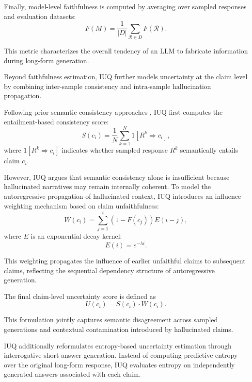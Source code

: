 Finally, model-level faithfulness is computed by averaging over sampled responses and evaluation datasets:
\begin{equation}
F(M)=\frac{1}{|D|}
\sum_{\mathcal{R}\in D}F(\mathcal{R}).
\end{equation}

This metric characterizes the overall tendency of an LLM to fabricate information during long-form generation.


Beyond faithfulness estimation, IUQ further models uncertainty at the claim level by combining inter-sample consistency and intra-sample hallucination propagation.

Following prior semantic consistency approaches , IUQ first computes the entailment-based consistency score:
\begin{equation}
S(c_i)=\frac{1}{N}\sum_{k=1}^{N}{1}[R^k\Rightarrow c_i],
\end{equation}
where ${1}[R^k\Rightarrow c_i]$ indicates whether sampled response $R^k$ semantically entails claim $c_i$.

However, IUQ argues that semantic consistency alone is insufficient because hallucinated narratives may remain internally coherent. To model the autoregressive propagation of hallucinated context, IUQ introduces an influence weighting mechanism based on claim unfaithfulness:
\begin{equation}
W(c_i)=\sum_{j=1}^{i}(1-F(c_j))E(i-j),
\end{equation}
where $E$ is an exponential decay kernel:
\begin{equation}
E(i)=e^{-\lambda i}.
\end{equation}

This weighting propagates the influence of earlier unfaithful claims to subsequent claims, reflecting the sequential dependency structure of autoregressive generation.

The final claim-level uncertainty score is defined as
\begin{equation}
U(c_i)=S(c_i)\cdot W(c_i).
\end{equation}

This formulation jointly captures semantic disagreement across sampled generations and contextual contamination introduced by hallucinated claims.


IUQ additionally reformulates entropy-based uncertainty estimation through interrogative short-answer generation. Instead of computing predictive entropy over the original long-form response, IUQ evaluates entropy on independently generated answers associated with each claim.

